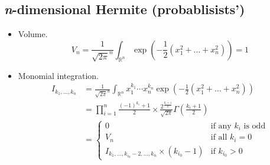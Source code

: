 \documentclass[draft]{scrartcl}
\begin{document}
\subsection*{\textit{n}-dimensional Hermite (probablisists')}
\begin{itemize}
  \item Volume.
    \begin{equation}
      V_n = \frac{1}{\sqrt{2\pi}^n} \int_{\mathbb{R}^n}
      \exp\left(-\frac{1}{2}(x_1^2+\dots+x_n^2)\right) = 1
    \end{equation}


  \item Monomial integration.
  \begin{align}\nonumber
    I_{k_1,\dots,k_n}
      &= \frac{1}{\sqrt{2\pi}^n} \int_{\mathbb{R}^n} x_1^{k_1}\cdots x_n^{k_n}
      \exp\left(-\frac{1}{2}(x_1^2+\dots+x_n^2)\right)\\
    &= \prod_{i=1}^n \frac{(-1)^{k_i} + 1}{2} \times
      \frac{2^{\frac{k_i+1}{2}}}{\sqrt{2\pi}} \Gamma\left(\frac{k_i+1}{2}\right)\\
    &=\begin{cases}
      0&\text{if any $k_i$ is odd}\\
      V_n&\text{if all $k_i=0$}\\
      I_{k_1,\dots,k_{i_0}-2,\dots,k_n} \times (k_{i_0} - 1)&\text{if $k_{i_0} > 0$}
    \end{cases}
  \end{align}
\end{itemize}


{}

\end{document}
